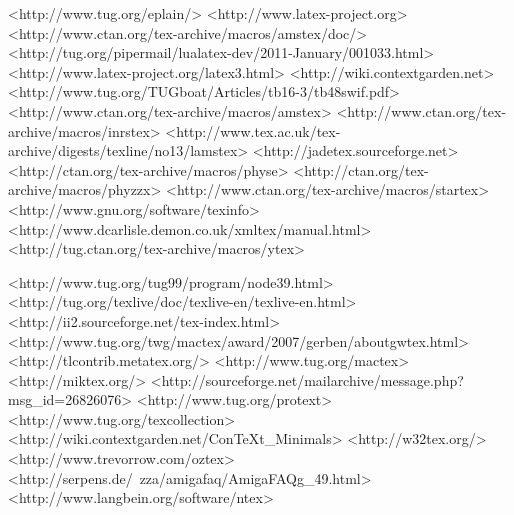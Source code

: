 	<http://www.tug.org/eplain/>
	<http://www.latex-project.org>
	<http://www.ctan.org/tex-archive/macros/amstex/doc/>
	<http://tug.org/pipermail/lualatex-dev/2011-January/001033.html>
	<http://www.latex-project.org/latex3.html>
	<http://wiki.contextgarden.net>
	<http://www.tug.org/TUGboat/Articles/tb16-3/tb48swif.pdf>
	<http://www.ctan.org/tex-archive/macros/amstex>
	<http://www.ctan.org/tex-archive/macros/inrstex>
	<http://www.tex.ac.uk/tex-archive/digests/texline/no13/lamstex>
	<http://jadetex.sourceforge.net>
	<http://ctan.org/tex-archive/macros/physe>
	<http://ctan.org/tex-archive/macros/phyzzx>
	<http://www.ctan.org/tex-archive/macros/startex>
	<http://www.gnu.org/software/texinfo>
	<http://www.dcarlisle.demon.co.uk/xmltex/manual.html>
	<http://tug.ctan.org/tex-archive/macros/ytex>

	<http://www.tug.org/tug99/program/node39.html>
	<http://tug.org/texlive/doc/texlive-en/texlive-en.html>
	<http://ii2.sourceforge.net/tex-index.html>
	<http://www.tug.org/twg/mactex/award/2007/gerben/aboutgwtex.html>
	<http://tlcontrib.metatex.org/>
	<http://www.tug.org/mactex>
	<http://miktex.org/>
	<http://sourceforge.net/mailarchive/message.php?msg_id=26826076>
	<http://www.tug.org/protext>
	<http://www.tug.org/texcollection>
	<http://wiki.contextgarden.net/ConTeXt_Minimals>
	<http://w32tex.org/>
	<http://www.trevorrow.com/oztex>
	<http://serpens.de/~zza/amigafaq/AmigaFAQg_49.html>
	<http://www.langbein.org/software/ntex>

